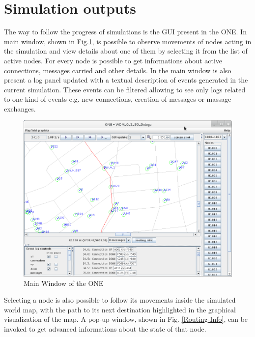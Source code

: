 \section{Simulation outputs}
The way to follow the progress of simulations is the GUI present in the ONE. In main window, shown in Fig.\ref{Schermata-ONE}, is possible to observe movements of nodes acting in the simulation and view details about one of them by selecting it from the list of active nodes. For every node is possible to get informations about active connections, messages carried and other details. In the main window is also present a log panel updated with a textual description of events generated in the current simulation. These events can be filtered allowing to see only logs related to one kind of events e.g. new connections, creation of messages or massage exchanges.
\\
\begin{figure}[htpb]
  \begin{center}
    \includegraphics[scale=0.9]{2-simulatore/img/Schermata-ONE.png}
    \caption[Main window]{Main Window of the ONE}    
    \label{Schermata-ONE}
  \end{center}
\end{figure}

Selecting a node is also possible to follow its movements inside the simulated world map, with the path to its next destination highlighted in the graphical visualization of the map. A pop-up window, shown in Fig. \ref{Routing-Info}, can be invoked to get advanced informations about the state of that node.
\\

